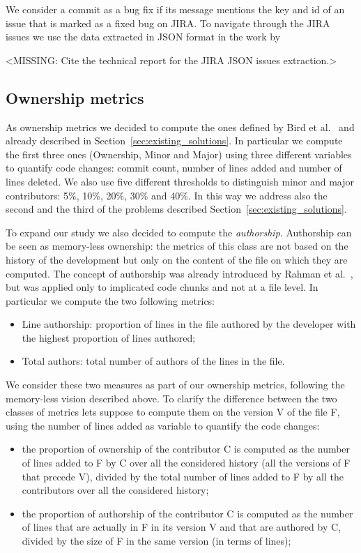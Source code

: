 We consider a commit as a bug fix if its message mentions the key and id of an issue that is marked as a fixed bug on JIRA. To navigate through the JIRA issues we use the data extracted in JSON format in the work by

<MISSING: Cite the technical report for the JIRA JSON issues extraction.>


\subsection{Ownership metrics}
\label{sec:ownership-metrics}
As ownership metrics we decided to compute the ones defined by Bird et al.~\cite{bird:original} and already described in Section~\ref{sec:existing_solutions}. In particular we compute the first three ones (Ownership, Minor and Major) using three different variables to quantify code changes: commit count, number of lines added and number of lines deleted. We also use five different thresholds to distinguish minor and major contributors: 5\%, 10\%, 20\%, 30\% and 40\%. In this way we address also the second and the third of the problems described Section~\ref{sec:existing_solutions}.

To expand our study we also decided to compute the \textit{authorship}. Authorship can be seen as memory-less ownership: the metrics of this class are not based on the history of the development but only on the content of the file on which they are computed. The concept of authorship was already introduced by Rahman et al.~\cite{Rahman:blame}, but was applied only to implicated code chunks and not at a file level. In particular we  compute the two following metrics:
\begin{itemize}
    \item Line authorship: proportion of lines in the file authored by the developer with the highest proportion of lines authored;
    \item Total authors: total number of authors of the lines in the file.
\end{itemize}

We consider these two measures as part of our ownership metrics, following the memory-less vision described above.
To clarify the difference between the two classes of metrics lets suppose to compute them on the version V of the file F, using the number of lines added as variable to quantify the code changes:
\begin{itemize}
\item the proportion of ownership of the contributor C is computed as the number of lines added to F by C over all the considered history (all the versions of F that precede V), divided by the total number of lines added to F by all the contributors over all the considered history;
\item the proportion of authorship of the contributor C is computed as the number of lines that are actually in F in its version V and that are authored by C, divided by the size of F in the same version (in terms of lines);
\end{itemize}

